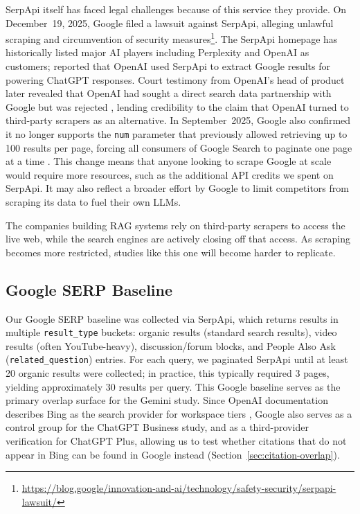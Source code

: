 SerpApi itself has faced legal challenges because of this service they provide. On December~19, 2025, Google filed a lawsuit against SerpApi, alleging unlawful scraping and circumvention of security measures\footnote{\url{https://blog.google/innovation-and-ai/technology/safety-security/serpapi-lawsuit/}}. The SerpApi homepage has historically listed major AI players including Perplexity and OpenAI as customers; \textcite{theinformation2025openaiserpapi} reported that OpenAI used SerpApi to extract Google results for powering ChatGPT responses. Court testimony from OpenAI's head of product later revealed that OpenAI had sought a direct search data partnership with Google but was rejected \parencite{techwireasia2025chrome}, lending credibility to the claim that OpenAI turned to third-party scrapers as an alternative. In September~2025, Google also confirmed it no longer supports the \texttt{num} parameter that previously allowed retrieving up to 100 results per page, forcing all consumers of Google Search to paginate one page at a time \parencite{searchengineland2025num100}. This change means that anyone looking to scrape Google at scale would require more resources, such as the additional API credits we spent on SerpApi. It may also reflect a broader effort by Google to limit competitors from scraping its data to fuel their own LLMs.

The companies building RAG systems rely on third-party scrapers to access the live web, while the search engines are actively closing off that access. As scraping becomes more restricted, studies like this one will become harder to replicate.

\subsection{Google SERP Baseline}
\label{sec:google-serp-types}

Our Google SERP baseline was collected via SerpApi, which returns results in multiple \texttt{result\_type} buckets: organic results (standard search results), video results (often YouTube-heavy), discussion/forum blocks, and People Also Ask (\texttt{related\_question}) entries. For each query, we paginated SerpApi until at least 20 organic results were collected; in practice, this typically required 3 pages, yielding approximately 30 results per query. This Google baseline serves as the primary overlap surface for the Gemini study. Since OpenAI documentation describes Bing as the search provider for workspace tiers \parencite{openai2024enterprise}, Google also serves as a control group for the ChatGPT Business study, and as a third-provider verification for ChatGPT Plus, allowing us to test whether citations that do not appear in Bing can be found in Google instead (Section~\ref{sec:citation-overlap}).

